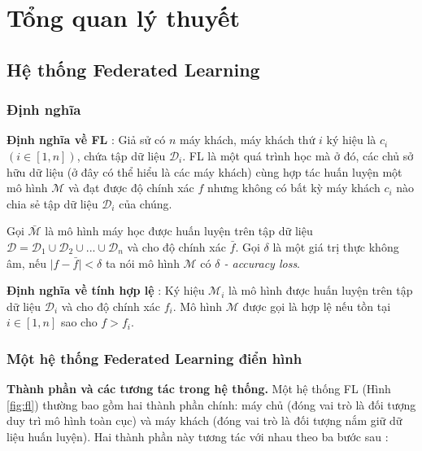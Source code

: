 \chapter{Tổng quan lý thuyết}
\label{Chapter2}

\section{Hệ thống Federated Learning}

\subsection{Định nghĩa}

\textbf{Định nghĩa về FL} \cite{yang2019federated}: Giả sử có $n$ máy khách, máy khách thứ $i$ ký hiệu là $c_i$ $(i\in [1, n])$, chứa tập dữ liệu $\mathcal{D}_i$. FL là một quá trình học mà ở đó, các chủ sở hữu dữ liệu (ở đây có thể hiểu là các máy khách) cùng hợp tác huấn luyện một mô hình $\mathcal{M}$ và đạt được độ chính xác $f$ nhưng không có bất kỳ máy khách $c_i$ nào chia sẻ tập dữ liệu $\mathcal{D}_i$ của chúng.

Gọi $\bar{\mathcal{M}}$ là mô hình máy học được huấn luyện trên tập dữ liệu $\mathcal{D}  = \mathcal{D}_1 \cup \mathcal{D}_2 \cup ... \cup \mathcal{D}_n$ và cho độ chính xác $\bar{f}$. Gọi $\delta$ là một giá trị thực không âm, nếu $\mid f-\bar{f}\mid < \delta$ ta nói mô hình $\mathcal{M}$ có \textit{$\delta$ - accuracy loss}.

\textbf{Định nghĩa về tính hợp lệ} \cite{li2021survey}: Ký hiệu $\mathcal{M}_i$ là mô hình được huấn luyện trên tập dữ liệu $\mathcal{D}_i$ và cho độ chính xác $f_i$. Mô hình $\mathcal{M}$ được gọi là hợp lệ nếu tồn tại $i\in [1,n]$ sao cho $f>f_i$.

\subsection{Một hệ thống Federated Learning điển hình}

\textbf{Thành phần và các tương tác trong hệ thống.} Một hệ thống FL (Hình \ref{fig:fl}) thường bao gồm hai thành phần chính: máy chủ (đóng vai trò là đối tượng duy trì mô hình toàn cục) và máy khách (đóng vai trò là đối tượng nắm giữ dữ liệu huấn luyện). Hai thành phần này tương tác với nhau theo ba bước sau \cite{lim2020federated}:

